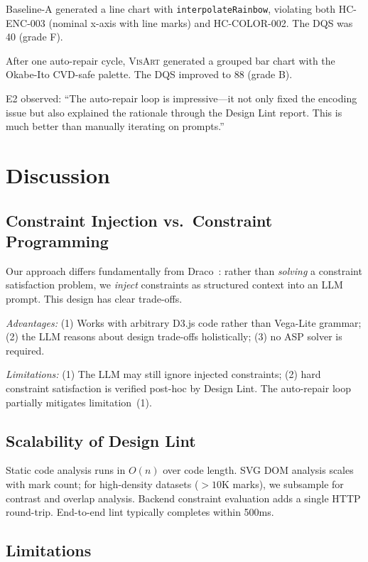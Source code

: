 \documentclass[final,5p,times,twocolumn]{elsarticle}
\newcommand{\sysname}{\textsc{VisArt}}
\begin{document}
Baseline-A generated a line chart with \texttt{interpolateRainbow}, violating both HC-ENC-003 (nominal x-axis with line marks) and HC-COLOR-002.
The DQS was 40 (grade F).

After one auto-repair cycle, \sysname{} generated a grouped bar chart with the Okabe-Ito CVD-safe palette.
The DQS improved to 88 (grade B).

E2 observed: ``The auto-repair loop is impressive---it not only fixed the encoding issue but also explained the rationale through the Design Lint report.
This is much better than manually iterating on prompts.''


\section{Discussion}

\subsection{Constraint Injection vs.\ Constraint Programming}

Our approach differs fundamentally from Draco~\cite{moritz2018formalizing}: rather than \textit{solving} a constraint satisfaction problem, we \textit{inject} constraints as structured context into an LLM prompt.
This design has clear trade-offs.

\textit{Advantages:}
(1) Works with arbitrary D3.js code rather than Vega-Lite grammar;
(2) the LLM reasons about design trade-offs holistically;
(3) no ASP solver is required.

\textit{Limitations:}
(1) The LLM may still ignore injected constraints;
(2) hard constraint satisfaction is verified post-hoc by Design Lint.
The auto-repair loop partially mitigates limitation~(1).

\subsection{Scalability of Design Lint}

Static code analysis runs in $O(n)$ over code length.
SVG DOM analysis scales with mark count; for high-density datasets ($>10$K marks), we subsample for contrast and overlap analysis.
Backend constraint evaluation adds a single HTTP round-trip.
End-to-end lint typically completes within 500ms.

\subsection{Limitations}
\end{document}

